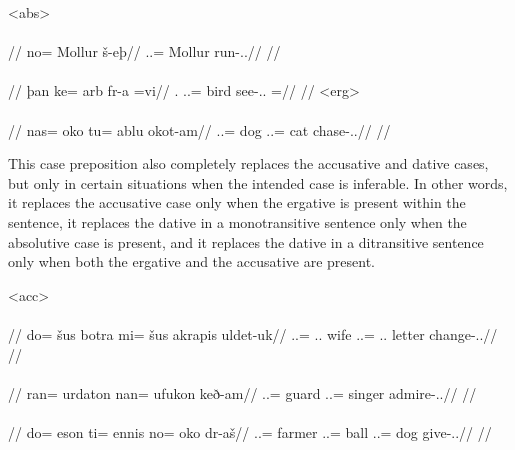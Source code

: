 	\a<abs>\begingl
		\glpreamble{}\\
		\\
		//
		\gla no= Mollur š-eþ//
		\glb \An.\Sg.\Top= Mollur run-\Ind.\Npst.\Prg//
		\glft{}//
	\endgl
	\a<abs-tr>\begingl
		\glpreamble{}\\
		\\
		//
		\gla þan ke= arb fr-a =vi//
		\glb \Sps.\Top{} \An.\Sg.\Dat= bird see-\Ind.\Npst.\Ipfv{} =\Q//
		\glft{}//
	\endgl
	\a<erg>\begingl
		\glpreamble{}\\
		\\
		//
		\gla nas= oko tu= ablu okot-am//
		\glb \An.\Pc.\Top= dog \An.\Sg.\Acc= cat chase-\Ind.\Pst.\Ipfv//
		\glft{}//
	\endgl
\xe

This case preposition also completely replaces the accusative and dative cases, but only in certain situations when the intended case is inferable. In other words, it replaces the accusative case only when the ergative is present within the sentence, it replaces the dative in a monotransitive sentence only when the absolutive case is present, and it replaces the dative in a ditransitive sentence only when both the ergative and the accusative are present.

	\a<acc>\begingl
		\glpreamble{}\\
		\\
		//
		\gla do= šus botra mi= šus akrapis uldet-uk//
		\glb \An.\Sg.\Erg= \Tpp.\An.\Gen{} wife \In.\Sg.\Top= \Tpp.\An.\Gen{} letter change-\Ind.\Pst.\Pfv//
		\glft{}//
	\endgl
	\a<dat-st>\begingl
		\glpreamble{}\\
		\\
		//
		\gla ran= urdaton nan= ufukon keð-am//
		\glb \An.\Pl.\Abs= guard \An.\Pl.\Top= singer admire-\Ind.\Pst.\Ipfv//
		\glft{}//
	\endgl
	\a<dat-ac>\begingl
		\glpreamble{}\\
		\\
		//
		\gla do= eson ti= ennis no= oko dr-aš//
		\glb \An.\Sg.\Erg= farmer \In.\Sg.\Acc= ball \An.\Sg.\Top= dog give-\Ind.\Npst.\Rtsp//
		\glft{}//
	\endgl
\xe

